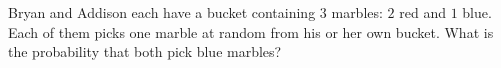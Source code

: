 Bryan and Addison each have a bucket containing $3$ marbles: $2$ red and $1$ blue. Each of them picks one marble at random from his or her own bucket. What is the probability that both pick blue marbles?
